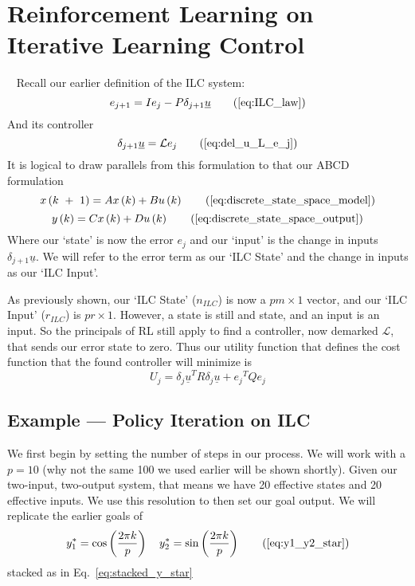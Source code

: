 \section{Reinforcement Learning on Iterative Learning Control}
~\label{sec:rl_on_ilc}
Recall our earlier definition of the ILC system:
\begin{equation}
	e_{j+1}=Ie_j-P\delta_{j+1}\underline{u}
    \tag{\ref{eq:ILC_law}}
\end{equation}
And its controller
\begin{equation}
	\delta_{j+1}\underline{u}=\mathcal{L}e_j
    \tag{\ref{eq:del_u_L_e_j}}
\end{equation}
It is logical to draw parallels from this formulation to that our ABCD formulation
\begin{equation}
    x\left(k\ +\ 1\right)=Ax\left(k\right)+Bu\left(k\right)
    \tag{\ref{eq:discrete_state_space_model}}
\end{equation}
\begin{equation}
    y\left(k\right)=Cx\left(k\right)+Du\left(k\right)
    \tag{\ref{eq:discrete_state_space_output}}
\end{equation}
Where our `state' is now the error $e_j$ and our `input' is the change in inputs $\delta_{j+1}\underline{u}$. We will refer to the error term as our `ILC State' and the change in inputs as our `ILC Input'. 

As previously shown, our `ILC State' ($n_{ILC}$) is now a $pm \times1$ vector, and our `ILC Input' ($r_{ILC}$) is $pr \times1$. However, a state is still and state, and an input is an input. So the principals of RL still apply to find a controller, now demarked $\mathcal{L}$, that sends our error state to zero. Thus our utility function that defines the cost function that the found controller will minimize is
\begin{equation}
    U_j = {\delta_j \underline{u}}^T R {\delta_j \underline{u}} + {e_j}^T Q {e_j}
    \label{eq:ilc_utility}
\end{equation}

\FloatBarrier\subsection{Example --- Policy Iteration on ILC}
We first begin by setting the number of steps in our process. We will work with a $p=10$ (why not the same 100 we used earlier will be shown shortly). Given our two-input, two-output system, that means we have 20 effective states and 20 effective inputs. We use this resolution to then set our goal output. We will replicate the earlier goals of
\begin{equation}
    y_1^\ast=\cos\left(\frac{2\pi k}{p}\right)
    \quad
    y_2^\ast=\sin\left(\frac{2\pi k}{p}\right)
    \tag{\ref{eq:y1_y2_star}}
\end{equation}
stacked as in Eq.~\ref{eq:stacked_y_star}

